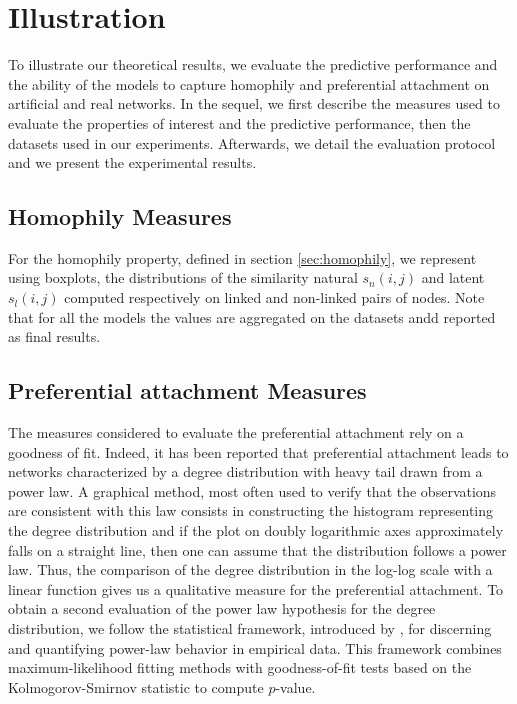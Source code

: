 \section{Illustration}

To illustrate our theoretical results, we evaluate the predictive performance and the ability of the models to capture homophily and preferential attachment on artificial and real networks. In the sequel, we first describe the measures used to evaluate the properties of interest and the predictive performance, then the datasets used in our experiments. Afterwards, we detail the evaluation protocol and we present the experimental results.

\subsection{Homophily Measures}

For the homophily property, defined in section \ref{sec:homophily}, we represent using boxplots, the distributions of the similarity natural $s_n(i,j)$ and latent $s_l(i,j)$ computed respectively on linked and non-linked pairs of nodes. Note that for all the models the values are aggregated on the datasets andd reported as final results.


\subsection{Preferential attachment Measures}
\label{sec:experiments-burst}

The measures considered to evaluate the preferential attachment rely on a goodness of fit. Indeed, it has been reported that preferential attachment leads to networks characterized by a degree distribution with heavy tail drawn from a power law. A graphical method, most often used to verify that the observations are consistent with this law  consists in constructing the histogram representing the degree distribution and if the plot on doubly logarithmic axes approximately falls on a straight line, then one can assume that the distribution follows a power law. Thus, the comparison of the degree distribution in the log-log scale with a linear function gives us a qualitative measure for the preferential attachment. To obtain a second evaluation of the power law hypothesis for the degree distribution, we follow the statistical framework, introduced by \cite{clauset2009power}, for discerning and quantifying power-law behavior in empirical data. This framework combines maximum-likelihood fitting methods with goodness-of-fit tests based on the Kolmogorov-Smirnov statistic to compute $p$-value.


